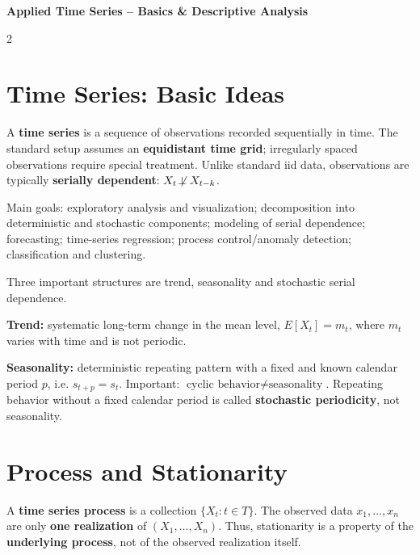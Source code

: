 \documentclass[9pt,a4paper]{extarticle}
\newcommand{\key}[1]{\textbf{#1}}
\begin{document}
\footnotesize

\begin{center}
{\large\bfseries Applied Time Series -- Basics \& Descriptive Analysis}
\end{center}
\vspace{-2mm}

\begin{multicols}{2}
\raggedcolumns

\section{Time Series: Basic Ideas}

A \key{time series} is a sequence of observations recorded sequentially in time. The standard setup assumes an \key{equidistant time grid}; irregularly spaced observations require special treatment. Unlike standard iid data, observations are typically \key{serially dependent}: \(X_t\not\!\perp X_{t-k}\).

Main goals: exploratory analysis and visualization; decomposition into deterministic and stochastic components; modeling of serial dependence; forecasting; time-series regression; process control/anomaly detection; classification and clustering.

Three important structures are trend, seasonality and stochastic serial dependence.

\key{Trend:} systematic long-term change in the mean level, \(E[X_t]=m_t\), where \(m_t\) varies with time and is not periodic.

\key{Seasonality:} deterministic repeating pattern with a fixed and known calendar period \(p\), i.e. \(s_{t+p}=s_t\). Important: \(\boxed{\text{cyclic behavior}\neq\text{seasonality}}\). Repeating behavior without a fixed calendar period is called \key{stochastic periodicity}, not seasonality.

\section{Process and Stationarity}

A \key{time series process} is a collection \(\{X_t:t\in T\}\). The observed data \(x_1,\ldots,x_n\) are only \key{one realization} of \((X_1,\ldots,X_n)\). Thus, stationarity is a property of the \key{underlying process}, not of the observed realization itself.


\end{multicols}
\end{document}
